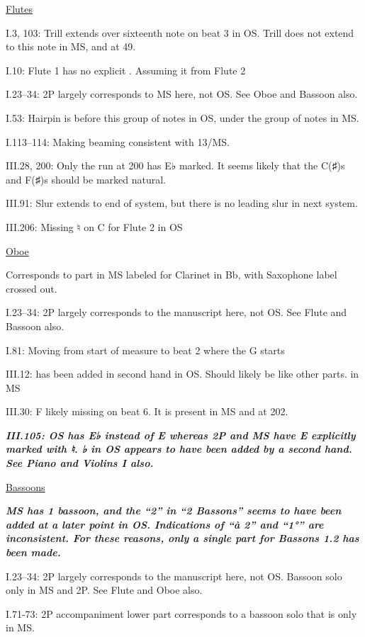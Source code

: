 \documentclass[twoside]{article}
\newcommand\dynmark[1]{\scalebox{0.9}{#1}{\kern1pt}}
\begin{document}
\begin{hangparas}{15pt}{1}
\begin{multicols}{2}
\underline{Flutes}

I.3, 103: Trill extends over sixteenth note on beat 3 in OS. Trill does not extend to this note in MS, and at 49.

I.10: Flute 1 has no explicit \dynmark{\mf}. Assuming it from Flute 2

I.23--34: 2P largely corresponds to MS here, not OS. See Oboe and Bassoon also.

I.53: Hairpin is before this group of notes in OS, under the group of notes in MS.

I.113--114: Making beaming consistent with 13/MS.

III.28, 200: Only the run at 200 has E♭ marked. It seems likely that the C(♯)s and F(♯)s should be marked natural.

III.91: Slur extends to end of system, but there is no leading slur in next system.

III.206: Missing ♮ on C for Flute 2 in OS

\underline{Oboe}

Corresponds to part in MS labeled for Clarinet in Bb, with Saxophone label crossed out.

I.23--34: 2P largely corresponds to the manuscript here, not OS. See Flute and Bassoon also.

I.81: Moving \dynmark{\mf} from start of measure to beat 2 where the G starts

III.12: \dynmark{\f} has been added in second hand in OS. Should likely be \dynmark{\ff} like other parts. \dynmark{\ff} in MS

III.30: F likely missing on beat 6. It is present in MS and at 202.

\textbf{\textit{III.105: OS has E♭ instead of E whereas 2P and MS have E explicitly marked with ♮. ♭ in OS appears to have been added by a second hand. See Piano and Violins I also.}}

\underline{Bassoons}

\textbf{\textit{MS has 1 bassoon, and the ``2'' in ``2 Bassons'' seems to have been added at a later point in OS. Indications of ``à 2'' and ``1°'' are inconsistent. For these reasons, only a single part for Bassons 1.2 has been made. }}

I.23--34: 2P largely corresponds to the manuscript here, not OS. Bassoon solo only in MS and 2P. See Flute and Oboe also.

I.71-73: 2P accompaniment lower part corresponds to a bassoon solo that is only in MS.


\end{multicols}
\end{hangparas}
\end{document}
